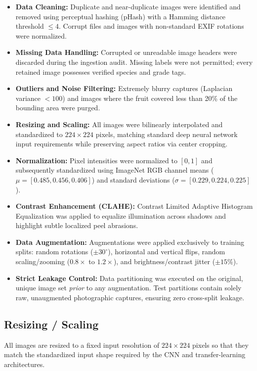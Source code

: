 \documentclass[11pt,a4paper]{article}
\begin{document}
\begin{itemize}
    \item \textbf{Data Cleaning:} Duplicate and near-duplicate images were identified and removed using perceptual hashing (pHash) with a Hamming distance threshold $\le 4$. Corrupt files and images with non-standard EXIF rotations were normalized.
    \item \textbf{Missing Data Handling:} Corrupted or unreadable image headers were discarded during the ingestion audit. Missing labels were not permitted; every retained image possesses verified species and grade tags.
    \item \textbf{Outliers and Noise Filtering:} Extremely blurry captures (Laplacian variance $< 100$) and images where the fruit covered less than 20\% of the bounding area were purged.
    \item \textbf{Resizing and Scaling:} All images were bilinearly interpolated and standardized to $224 \times 224$ pixels, matching standard deep neural network input requirements while preserving aspect ratios via center cropping.
    \item \textbf{Normalization:} Pixel intensities were normalized to $[0, 1]$ and subsequently standardized using ImageNet RGB channel means ($\mu = [0.485, 0.456, 0.406]$) and standard deviations ($\sigma = [0.229, 0.224, 0.225]$).
    \item \textbf{Contrast Enhancement (CLAHE):} Contrast Limited Adaptive Histogram Equalization was applied to equalize illumination across shadows and highlight subtle localized peel abrasions.
    \item \textbf{Data Augmentation:} Augmentations were applied exclusively to training splits: random rotations ($\pm 30^\circ$), horizontal and vertical flips, random scaling/zooming ($0.8 \times$ to $1.2 \times$), and brightness/contrast jitter ($\pm 15\%$).
    \item \textbf{Strict Leakage Control:} Data partitioning was executed on the original, unique image set \emph{prior} to any augmentation. Test partitions contain solely raw, unaugmented photographic captures, ensuring zero cross-split leakage.
\end{itemize}

\subsection{Resizing / Scaling}
All images are resized to a fixed input resolution of $224 \times 224$ pixels so that they match the standardized input shape required by the CNN and transfer-learning architectures.
\end{document}
